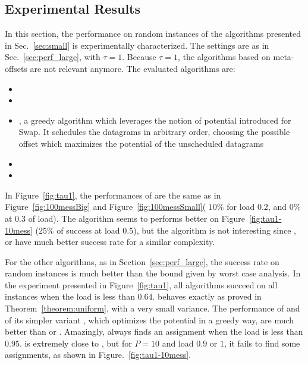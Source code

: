\subsection{Experimental Results} \label{sec:perf_small}


In this section, the performance on random instances of the algorithms presented in Sec.~\ref{sec:small} is experimentally characterized. The settings are as in Sec.~\ref{sec:perf_large}, with $\tau = 1$.
Because $\tau =1$, the algorithms based on meta-offsets are not relevant anymore. The evaluated algorithms are:


\begin{itemize}
  \item \firstfit
  \item \greedyuniform 
  \item \greedypotential, a greedy algorithm which leverages the notion of potential introduced for Swap. 
  It schedules the datagrams in arbitrary order, choosing the possible offset which maximizes the potential of the unscheduled datagrams
  \item \swapandmove 
  \item \ESCA
\end{itemize}

In Figure~\ref{fig:tau1}, the performances of \shortestlongest are the same as in Figure~\ref{fig:100messBig} and Figure~\ref{fig:100messSmall}( $10\%$ for load  $0.2$, and $0\%$ at $0.3$ of load). The algorithm seems to performs better on Figure~\ref{fig:tau1-10mess} ($25\%$ of success at load $0.5$), but the algorithm is not interesting since \greedypotential, \firstfit or \greedyuniform have much better success rate for a similar complexity.

For the other algorithms, as in Section~\ref{sec:perf_large}, the success rate on random instances is much better than the bound given by worst case analysis. In the experiment presented in Figure~\ref{fig:tau1}, all algorithms succeed on all instances when the load is less than $0.64$. \greedyuniform behaves exactly as proved in Theorem~\ref{theorem:uniform}, with a very small variance. The performance of \swapandmove and of its simpler variant \greedypotential, which optimizes the potential in a greedy way, are much better than \firstfit or \greedyuniform. Amazingly, \swapandmove always finds an assignment when the load is less than $0.95$. \swapandmove is extremely close to \ESCA, but for $P=10$ and load $0.9$ or $1$, it fails to find some assignments, as shown in Figure.~\ref{fig:tau1-10mess}.

